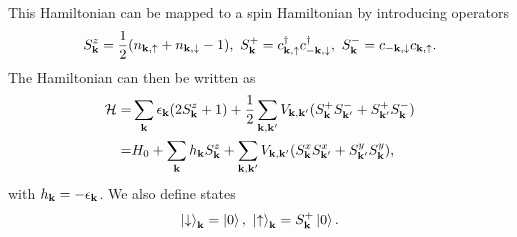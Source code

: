 This Hamiltonian can be mapped to a spin Hamiltonian by introducing operators
\begin{align*}
	S_{\vb{k}}^{z} = \frac{1}{2}(n_{\vb{k}, \uparrow} + n_{\vb{k}, \downarrow} - 1),\ S_{\vb{k}}^{+} = c_{\vb{k}, \uparrow}^{\dagger} c_{-\vb{k}, \downarrow}^{\dagger},\ S_{\vb{k}}^{-} = c_{-\vb{k}, \downarrow}c_{\vb{k}, \uparrow}.
\end{align*}
The Hamiltonian can then be written as
\begin{align*}
	\mathcal{H} =& \sum\limits_{\vb{k}}\epsilon_{\vb{k}}(2S_{\vb{k}}^{z} + 1) + \frac{1}{2}\sum\limits_{\vb{k}, \vb{k}^{\prime}}V_{\vb{k}, \vb{k}^{\prime}}(S_{\vb{k}}^{+}S_{\vb{k}^{\prime}}^{-} + S_{\vb{k}^{\prime}}^{+}S_{\vb{k}}^{-}) \\
	     =& H_{0} + \sum\limits_{\vb{k}}h_{\vb{k}}S_{\vb{k}}^{z} + \sum\limits_{\vb{k}, \vb{k}^{\prime}}V_{\vb{k}, \vb{k}^{\prime}}(S_{\vb{k}}^{x}S_{\vb{k}^{\prime}}^{x} + S_{\vb{k}^{\prime}}^{y}S_{\vb{k}}^{y}),
\end{align*}
with $h_{\vb{k}} = -\epsilon_{\vb{k}}$. We also define states
\begin{align*}
	\ket{\downarrow}_{\vb{k}} = \ket{0},\ \ket{\uparrow}_{\vb{k}} = S_{\vb{k}}^{+}\ket{0}.
\end{align*}

